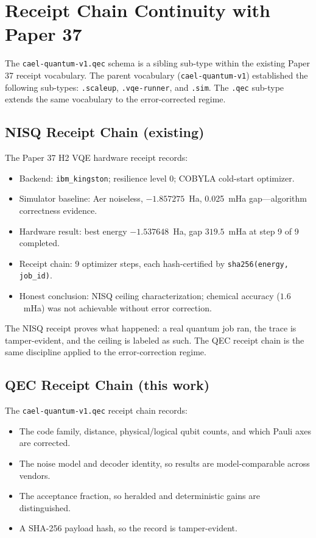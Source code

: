 \documentclass[conference]{IEEEtran}
\begin{document}
\section{Receipt Chain Continuity with Paper 37}
\label{sec:receipt-chain}

The \texttt{cael-quantum-v1.qec} schema is a sibling sub-type within the
existing Paper 37 receipt vocabulary. The parent vocabulary
(\texttt{cael-quantum-v1}) established the following sub-types:
\texttt{.scaleup}, \texttt{.vqe-runner}, and \texttt{.sim}. The
\texttt{.qec} sub-type extends the same vocabulary to the
error-corrected regime.

\subsection{NISQ Receipt Chain (existing)}

The Paper 37 H2 VQE hardware receipt records:
\begin{itemize}
  \item Backend: \texttt{ibm\_kingston}; resilience level 0; COBYLA
    cold-start optimizer.
  \item Simulator baseline: Aer noiseless, $-1.857275$~Ha, 0.025~mHa
    gap---algorithm correctness evidence.
  \item Hardware result: best energy $-1.537648$~Ha, gap $319.5$~mHa
    at step 9 of 9 completed.
  \item Receipt chain: 9 optimizer steps, each hash-certified by
    \texttt{sha256(energy, job\_id)}.
  \item Honest conclusion: NISQ ceiling characterization; chemical
    accuracy ($1.6$~mHa) was not achievable without error correction.
\end{itemize}

The NISQ receipt proves what happened: a real quantum job ran, the
trace is tamper-evident, and the ceiling is labeled as such. The QEC
receipt chain is the same discipline applied to the error-correction regime.

\subsection{QEC Receipt Chain (this work)}

The \texttt{cael-quantum-v1.qec} receipt chain records:
\begin{itemize}
  \item The code family, distance, physical/logical qubit counts, and
    which Pauli axes are corrected.
  \item The noise model and decoder identity, so results are
    model-comparable across vendors.
  \item The acceptance fraction, so heralded and deterministic gains
    are distinguished.
  \item A SHA-256 payload hash, so the record is tamper-evident.
\end{itemize}
\end{document}
